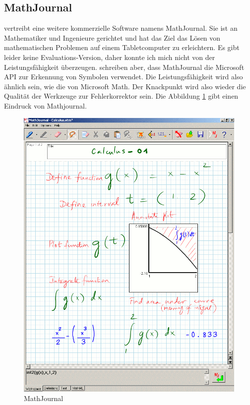 \subsection{MathJournal}

\citet{mathjournal} vertreibt eine weitere kommerzielle Software namens MathJournal. Sie ist an Mathematiker und Ingenieure gerichtet und hat das Ziel das Lösen von mathematischen Problemen auf einem Tabletcomputer zu erleichtern. Es gibt leider keine Evaluations-Version, daher konnte ich mich nicht von der Leistungsfähigkeit überzeugen. \citet{Tapia:2007p9160} schreiben aber, dass MathJournal die Microsoft API zur Erkennung von Symbolen verwendet. Die Leistungsfähigkeit wird also ähnlich sein, wie die von Microsoft Math. Der Knackpunkt wird also wieder die Qualität der Werkzeuge zur Fehlerkorrektor sein. Die Abbildung \ref{fig:mathjournal} gibt einen Eindruck von Mathjournal.

\begin{figure}
  \begin{center}
    \includegraphics[width=.9\textwidth]{figures/mathjournal.png}
  \end{center}
  \caption{MathJournal}
  \label{fig:mathjournal}
\end{figure}

